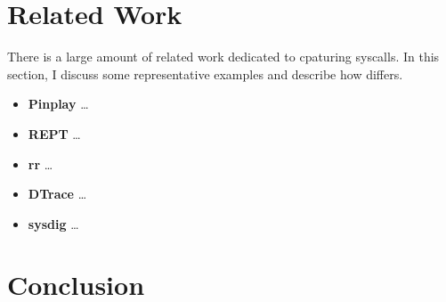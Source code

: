 \section{Related Work}
There is a large amount of related work dedicated to cpaturing syscalls. In this section, I discuss some representative examples and describe
how \TheName differs.

\begin{itemize}
    \item \textbf{Pinplay} \dots
    \item \textbf{REPT} \dots
    \item \textbf{rr} \dots
    \item \textbf{DTrace} \dots
    \item \textbf{sysdig} \dots
\end{itemize}


\section{Conclusion}

